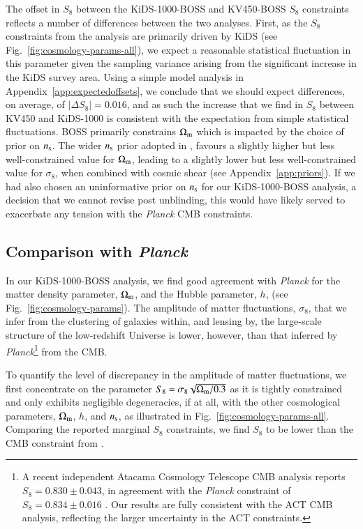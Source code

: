 The offset in $S_8$ between the KiDS-1000-BOSS and KV450-BOSS $S_8$ constraints reflects a number of differences between the two analyses.  First, as the $S_8$ constraints from the \tttp analysis are primarily driven by KiDS (see Fig.~\ref{fig:cosmology-params-all}), we expect a reasonable statistical fluctuation in this parameter given the sampling variance arising from the significant increase in the KiDS survey area.  Using a simple model analysis in Appendix~\ref{app:expectedoffsets}, we conclude that we should expect differences, on average, of $|\Delta S_8| = 0.016$, and as such the increase that we find in $S_8$ between KV450 and KiDS-1000 is consistent with the expectation from simple statistical fluctuations.   BOSS primarily constrains $\Omega_{\rm m}$ which is impacted by the choice of prior on $n_{\rm s}$.  The wider $n_{\rm s}$ prior adopted in \citet{troester/etal:2020}, favours a slightly higher but less well-constrained value for $\Omega_{\rm m}$, leading to a slightly lower but less well-constrained value for $\sigma_8$, when combined with cosmic shear (see Appendix~\ref{app:priors}).   If we had also chosen an uninformative prior on $n_{\rm s}$ for our KiDS-1000-BOSS analysis, a decision that we cannot revise post unblinding, this would have likely served to exacerbate any tension with the {\it Planck} CMB constraints.   



\subsection{Comparison with {\it Planck}}
\label{sec:planck_comp}
In our KiDS-1000-BOSS \tttp analysis, we find good agreement with {\it Planck} for the matter density parameter, $\Omega_{\rm m}$, and the Hubble parameter, $h$, (see Fig.~\ref{fig:cosmology-params}).
The amplitude of matter fluctuations, $\sigma_8$, that we infer from the clustering of galaxies within, and lensing by, the large-scale structure of the low-redshift Universe is lower, however, than that inferred by {\it Planck}\footnote{A recent independent Atacama Cosmology Telescope CMB analysis reports $S_8=0.830 \pm 0.043$, in agreement with the {\it Planck} constraint of $S_8=0.834 \pm 0.016$ \citep[ACT,][]{aiola/etal:2020}.   Our results are fully consistent with the ACT CMB analysis, reflecting the larger uncertainty in the ACT constraints.} from the CMB. 

To quantify the level of discrepancy in the amplitude of matter fluctuations, we first concentrate on the parameter $S_{8} = \sigma_8 \sqrt{\Omega_{\rm m}/0.3}$ as it is tightly constrained and only exhibits negligible degeneracies, if at all, with the other cosmological parameters, $\Omega_{\rm m}$, $h$, and $n_{\rm s}$, as illustrated in Fig.~\ref{fig:cosmology-params-all}.   Comparing the reported marginal $S_8$ constraints, we find $S_8$ to be \kpoffperc lower than the CMB constraint from \citet{planck/etal:2018}.

